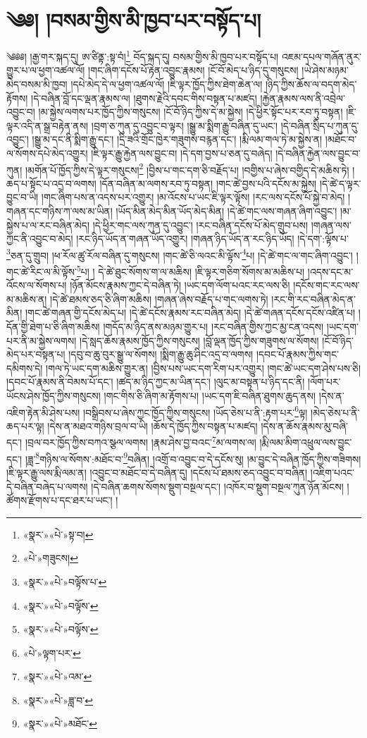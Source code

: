 \chapter{༄༅། །བསམ་གྱིས་མི་ཁྱབ་པར་བསྟོད་པ།}༄༅༅། །རྒྱ་གར་སྐད་དུ། ཨ་ཙིནྟ་:སྟ་བཾ།\footnote{«སྣར་»«པེ་»སྟ་བ།} བོད་སྐད་དུ། བསམ་གྱིས་མི་ཁྱབ་པར་བསྟོད་པ། འཇམ་དཔལ་གཞོན་ནུར་གྱུར་པ་ལ་ཕྱག་འཚལ་ལོ། །གང་ཞིག་དངོས་པོ་རྟེན་འབྱུང་རྣམས། །ངོ་བོ་མེད་པ་ཉིད་དུ་གསུངས། །ཡེ་ཤེས་མཉམ་མེད་བསམ་མི་ཁྱབ། །དཔེ་མེད་དེ་ལ་ཕྱག་འཚལ་ལོ། །ཇི་ལྟར་ཁྱོད་ཀྱིས་ཐེག་ཆེན་ལ། །ཉིད་ཀྱིས་ཆོས་ལ་བདག་མེད་རྟོགས། །དེ་བཞིན་བློ་དང་ལྡན་རྣམས་ལ། །ཐུགས་རྗེའི་དབང་གིས་བསྟན་པ་མཛད། །རྐྱེན་རྣམས་ལས་ནི་འབྲེལ་འབྱུང་བ། །མ་སྐྱེས་ལགས་པར་ཁྱོད་ཀྱིས་གསུངས། །ངོ་བོ་ཉིད་ཀྱིས་དེ་མ་སྐྱེས། །དེ་ཕྱིར་སྟོང་པར་རབ་ཏུ་བསྟན། །ཇི་ལྟར་འདི་ན་སྒྲ་བརྟེན་ནས། །བྲག་ཅ་ཀུན་དུ་འབྱུང་བ་ལྟར། །སྒྱུ་མ་སྨིག་རྒྱུ་བཞིན་དུ་ཡང་། །དེ་བཞིན་སྲིད་པ་ཀུན་དུ་འབྱུང་། །སྒྱུ་མ་དང་ནི་སྨིག་རྒྱུ་དང་། །དྲི་ཟའི་གྲོང་ཁྱེར་གཟུགས་བརྙན་དང་། །རྨི་ལམ་གལ་ཏེ་མ་སྐྱེས་ན། །མཐོང་བ་ལ་སོགས་དཔེ་མེད་འགྱུར། །ཇི་ལྟར་རྒྱུ་རྐྱེན་ལས་བྱུང་བ། །དེ་དག་བྱས་པ་ཅན་དུ་བཞེད། །དེ་བཞིན་རྐྱེན་ལས་བྱུང་བ་ཀུན། །མགོན་པོ་ཁྱོད་ཀྱིས་དེ་ལྟར་གསུངས།\footnote{«པེ་»གཟུངས།} །བྱིས་པ་གང་དག་ཅི་བརྗོད་པ། །བགྱིས་པ་ཞེས་བགྱིད་དེ་མཆིས་ཏེ། །ཆད་པ་སྟོང་པ་འདྲ་བ་ལགས། །དོན་བཞིན་མ་ལགས་རབ་ཏུ་བསྟན། །གང་ཚེ་བྱས་པའི་དངོས་མ་སྐྱེས། །དེ་ཚེ་ད་ལྟར་བྱུང་བ་ཡི། །གང་ཞིག་པས་ན་འདས་པར་འགྱུར། །མ་འོངས་པ་ཡང་ཇི་ལྟར་ལྟོས། །རང་ལས་དངོས་པོ་སྐྱེ་བ་མེད། །གཞན་དང་གཉིས་ཀ་ལས་མ་ཡིན། །ཡོད་མིན་མེད་མིན་ཡོད་མེད་མིན། །དེ་ཚེ་གང་ལས་གཞན་ཞིག་འབྱུང་། །མ་སྐྱེས་པ་ལ་རང་བཞིན་མེད། །དེ་ཕྱིར་གང་ལས་ཀུན་དུ་འབྱུང་། །རང་བཞིན་དངོས་པོ་མེད་གྲུབ་པས། །གཞན་ལས་ཀྱང་ནི་འབྱུང་བ་མེད། །རང་ཉིད་ཡོད་ན་གཞན་ཡོད་འགྱུར། །གཞན་ཉིད་ཡོད་ན་རང་ཉིད་ཡོད། །དེ་དག་:ལྟོས་པ་\footnote{«སྣར་»«པེ་»བལྟོས་པ་}ཅན་དུ་གྲུབ། །ཕ་རོལ་ཚུ་རོལ་བཞིན་དུ་གསུངས། །གང་ཚེ་ཅི་ལའང་མི་ལྟོས་\footnote{«སྣར་»«པེ་»བལྟོས་}པ། །དེ་ཚེ་གང་ལ་གང་ཞིག་འབྱུང་། །གང་ཚེ་རིང་ལ་མི་ལྟོས་\footnote{«སྣར་»«པེ་»བལྟོས་}པ། །
དེ་ཚེ་ཐུང་སོགས་ག་ལ་མཆིས། །ཇི་ལྟར་གཅིག་སོགས་མ་མཆིས་པ། །འདས་དང་མ་འོངས་ལ་སོགས་པ། །ཉོན་མོངས་རྣམས་ཀྱང་དེ་བཞིན་ཏེ། །ཡང་དག་ལོག་པའང་རང་ལས་ཅི། །དངོས་གང་རང་ལས་མ་མཆིས་ན། །དེ་ཚེ་ཐམས་ཅད་ཅི་ཞིག་མཆིས། །གཞན་ཞེས་བརྗོད་པ་གང་ལགས་ཏེ། །རང་གི་རང་བཞིན་མེད་ན་མིན། །གང་ཚེ་གཞན་གྱི་དངོས་མེད་པ། །དེ་ཚེ་དངོས་རྣམས་རང་བཞིན་མེད། །དེ་ཚེ་གཞན་དངོས་དངོས་འཛིན་པ། །དོན་གྱི་ཐེག་པ་ཅི་ཞིག་མཆིས། །གདོད་མ་ཉིད་ནས་མཉམ་གྱུར་པ། །རང་བཞིན་གྱིས་ཀྱང་མྱ་ངན་འདས། །ཡང་དག་པར་ནི་མ་སྐྱེས་ལགས། །དེ་སླད་ཆོས་རྣམས་ཁྱོད་ཀྱིས་གསུངས། །བློ་ལྡན་ཁྱོད་ཀྱིས་གཟུགས་ལ་སོགས། །ངོ་བོ་ཉིད་མེད་པར་བསྟན་པ། །དབུ་བ་ཆུ་བུར་སྒྱུ་ལ་སོགས། །སྨིག་རྒྱུ་ཆུ་ཤིང་འདྲ་བ་ལགས། །དབང་པོ་རྣམས་ཀྱིས་གང་དམིགས་དེ། །གལ་ཏེ་ཡང་དག་མཆིས་གྱུར་ན། །བྱིས་པས་ཡང་དག་རིག་པར་འགྱུར། །གང་ཚེ་ཡང་དག་ཤེས་པས་ཅི། །དབང་པོ་རྣམས་ནི་བེམས་པོ་དང་། །ཚད་མ་ཉིད་ཀྱང་མ་ཡིན་དང་། །ལུང་མ་བསྟན་པ་ཉིད་དང་ནི། །ལོག་པར་ཡོངས་ཤེས་ཁྱོད་ཀྱིས་གསུངས། །གང་གིས་ཅི་ཞིག་མ་རྟོགས་པ། །ཡང་དག་ཇི་བཞིན་ཐུགས་ཆུད་ནས། །དེས་ན་འཇིག་རྟེན་མི་ཤེས་པས། །བསྒྲིབས་པ་ཞེས་ཀྱང་ཁྱོད་ཀྱིས་གསུངས། །ཡོད་ཅེས་པ་ནི་:རྟག་པར་\footnote{«པེ་»ལྟག་པར་}ལྟ། །མེད་ཅེས་པ་ནི་ཆད་པར་ལྟ། །དེས་ན་མཐའ་གཉིས་བྲལ་བ་ཡི། །ཆོས་དེ་ཁྱོད་ཀྱིས་བསྟན་པ་མཛད། །དེས་ན་ཆོས་རྣམས་མུ་བཞི་དང་། །བྲལ་བར་ཁྱོད་ཀྱིས་བཀའ་སྩལ་ལགས། །རྣམ་ཤེས་བྱ་བའང་\footnote{«སྣར་»«པེ་»འམ་}མ་ལགས་ལ། །རྨི་ལམ་མིག་འཕྲུལ་ལས་བྱུང་དང་། །ཟླ་\footnote{«སྣར་»«པེ་»ཟླ་བ་}གཉིས་ལ་སོགས་:མཐོང་བ་\footnote{«སྣར་»«པེ་»མཐོང་}བཞིན། །འགྲོ་བ་འབྱུང་བ་དེ་དངོས་སུ། །མ་བྱུང་དེ་བཞིན་ཁྱོད་ཀྱིས་གཟིགས། །ཇི་ལྟར་རྒྱུ་ལས་རྨི་ལམ་ན། །འབྱུང་བ་མཐོང་བ་དེ་བཞིན་དུ། །དངོས་པོ་ཐམས་ཅད་འབྱུང་བ་བཞིན། །འཇིག་པའང་དེ་བཞིན་བཞེད་པ་ལགས། །དེ་བཞིན་ཆགས་སོགས་སྡུག་བསྔལ་དང་། །འཁོར་བ་སྡུག་བསྔལ་ཀུན་ཉོན་མོངས། །ཚོགས་རྫོགས་པ་དང་ཐར་པ་ཡང་། །

